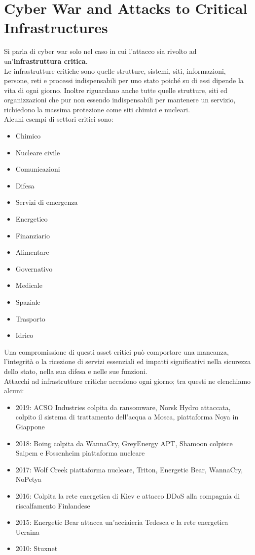 \section{Cyber War and Attacks to Critical Infrastructures}
\label{sec:cyberwar}
Si parla di cyber war solo nel caso in cui l'attacco sia rivolto ad un'\textbf{infrastruttura critica}.\\
Le infrastrutture critiche sono quelle strutture, sistemi, siti, informazioni, persone, reti e processi indispensabili per uno stato poiché su di essi dipende la vita di ogni giorno.
Inoltre riguardano anche tutte quelle strutture, siti ed organizzazioni che pur non essendo indispensabili per mantenere un servizio, richiedono la massima protezione come siti chimici e nucleari.\\
Alcuni esempi di settori critici sono:
\begin{itemize}[noitemsep]
    \item Chimico
    \item Nucleare civile
    \item Comunicazioni
    \item Difesa
    \item Servizi di emergenza
    \item Energetico
    \item Finanziario
    \item Alimentare
    \item Governativo
    \item Medicale
    \item Spaziale
    \item Trasporto
    \item Idrico
\end{itemize}
Una compromissione di questi asset critici può comportare una mancanza, l'integrità o la ricezione di servizi essenziali ed impatti significativi nella sicurezza dello stato, nella sua difesa e nelle sue funzioni.\\
Attacchi ad infrastrutture critiche accadono ogni giorno; tra questi ne elenchiamo alcuni:
\begin{itemize}[noitemsep]
    \item 2019: ACSO Industries colpita da ransomware, Norsk Hydro attaccata, colpito il sistema di trattamento dell'acqua a Mosca, piattaforma Noya in Giappone
    \item 2018: Boing colpita da WannaCry, GreyEnergy APT, Shamoon colpisce Saipem e Fossenheim piattaforma nucleare
    \item 2017: Wolf Creek piattaforma nucleare, Triton, Energetic Bear, WannaCry, NoPetya
    \item 2016: Colpita la rete energetica di Kiev e attacco \acrshort{DDoS} alla compagnia di riscalfamento Finlandese
    \item 2015: Energetic Bear attacca un'acciaieria Tedesca e la rete energetica Ucraina
    \item 2010: Stuxnet
\end{itemize}
